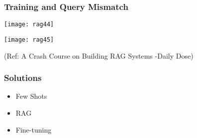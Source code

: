 \begin{frame}[fragile]\frametitle{Training and Query Mismatch}


		\begin{center}
		\texttt{[image: rag44]}
		
		\texttt{[image: rag45]}
		
		\end{center}

{\tiny (Ref: A Crash Course on Building RAG Systems -Daily Dose)}

\end{frame}


\begin{frame}[fragile]\frametitle{Solutions}
  \begin{itemize}
    \item Few Shots
	\item RAG
	\item Fine-tuning
  \end{itemize}
\end{frame}










